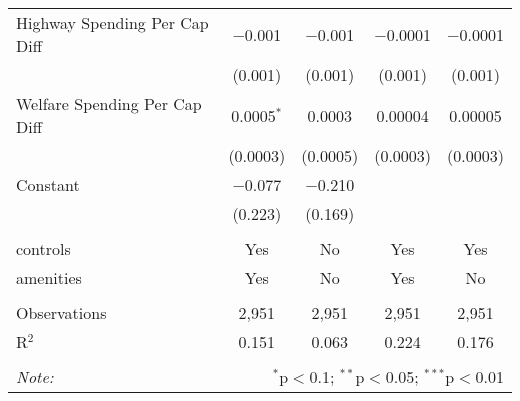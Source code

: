 \begin{table}[!htbp]
\begin{tabular}{@{\extracolsep{5pt}}lcccc}
  Highway Spending Per Cap Diff & $-$0.001 & $-$0.001 & $-$0.0001 & $-$0.0001 \\ 
  & (0.001) & (0.001) & (0.001) & (0.001) \\ 
  Welfare Spending Per Cap Diff & 0.0005$^{*}$ & 0.0003 & 0.00004 & 0.00005 \\ 
  & (0.0003) & (0.0005) & (0.0003) & (0.0003) \\ 
  Constant & $-$0.077 & $-$0.210 &  &  \\ 
  & (0.223) & (0.169) &  &  \\ 
 \hline \\[-1.8ex] 
controls & Yes & No & Yes & Yes \\ 
amenities & Yes & No & Yes & No \\ 
\hline \\[-1.8ex] 
Observations & 2,951 & 2,951 & 2,951 & 2,951 \\ 
R$^{2}$ & 0.151 & 0.063 & 0.224 & 0.176 \\ 
\hline 
\hline \\[-1.8ex] 
\textit{Note:}  & \multicolumn{4}{r}{$^{*}$p$<$0.1; $^{**}$p$<$0.05; $^{***}$p$<$0.01} \\ 
\end{tabular} 
\end{table} 

